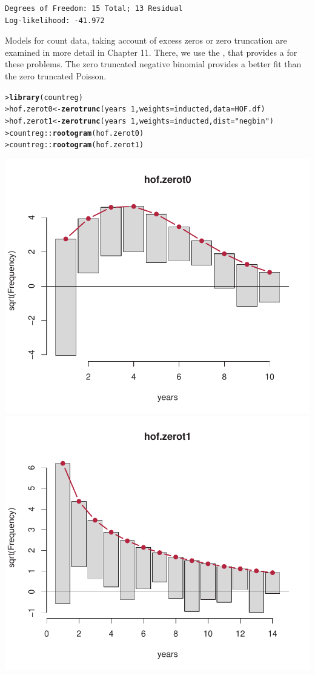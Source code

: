 \documentclass[10pt]{report}\usepackage[]{graphicx}\usepackage[]{color}
\makeatletter
\newcommand{\hlnum}[1]{\textcolor[rgb]{0.686,0.059,0.569}{#1}}%
\newcommand{\hlstr}[1]{\textcolor[rgb]{0.192,0.494,0.8}{#1}}%
\newcommand{\hlopt}[1]{\textcolor[rgb]{0,0,0}{#1}}%
\newcommand{\hlstd}[1]{\textcolor[rgb]{0.345,0.345,0.345}{#1}}%
\newcommand{\hlkwb}[1]{\textcolor[rgb]{0.69,0.353,0.396}{#1}}%
\newcommand{\hlkwc}[1]{\textcolor[rgb]{0.333,0.667,0.333}{#1}}%
\newcommand{\hlkwd}[1]{\textcolor[rgb]{0.737,0.353,0.396}{\textbf{#1}}}%
\newenvironment{kframe}{%
 \def\at@end@of@kframe{}%
 \ifinner\ifhmode%
  \def\at@end@of@kframe{\end{minipage}}%
  \begin{minipage}{\columnwidth}%
 \fi\fi%
 \def\FrameCommand##1{\hskip\@totalleftmargin \hskip-\fboxsep
 \colorbox{shadecolor}{##1}\hskip-\fboxsep
     \hskip-\linewidth \hskip-\@totalleftmargin \hskip\columnwidth}%
 \MakeFramed {\advance\hsize-\width
   \@totalleftmargin\z@ \linewidth\hsize
   \@setminipage}}%
 {\par\unskip\endMakeFramed%
 \at@end@of@kframe}
\newenvironment{knitrout}{}{} %
\renewenvironment{knitrout}{\small\renewcommand{\baselinestretch}{.85}}{} %
\makeatother
\begin{document}
\begin{Exercises}
\begin{enumerate*}
\begin{ans}
\begin{knitrout}
\begin{kframe}
\begin{verbatim}
Degrees of Freedom: 15 Total; 13 Residual
Log-likelihood: -41.972 
\end{verbatim}
\end{kframe}
\end{knitrout}
      Models for count data, taking account of excess zeros or zero truncation are examined in more detail
      in Chapter 11.  There, we use the , that provides a  for these
      problems.  The zero truncated negative binomial provides a better fit than the zero truncated Poisson.
\begin{knitrout}\footnotesize
{}\color{fgcolor}\begin{kframe}
\begin{alltt}
\hlstd{> }\hlkwd{library}\hlstd{(countreg)}
\hlstd{> }\hlstd{hof.zerot0} \hlkwb{<-} \hlkwd{zerotrunc}\hlstd{(years} \hlopt{~} \hlnum{1}\hlstd{,} \hlkwc{weights} \hlstd{= inducted,} \hlkwc{data}\hlstd{=HOF.df)}
\hlstd{> }\hlstd{hof.zerot1} \hlkwb{<-} \hlkwd{zerotrunc}\hlstd{(years} \hlopt{~} \hlnum{1}\hlstd{,} \hlkwc{weights} \hlstd{= inducted,} \hlkwc{dist}\hlstd{=}\hlstr{"negbin"}\hlstd{)}
\hlstd{> }\hlstd{countreg}\hlopt{::}\hlkwd{rootogram}\hlstd{(hof.zerot0)}
\hlstd{> }\hlstd{countreg}\hlopt{::}\hlkwd{rootogram}\hlstd{(hof.zerot1)}
\end{alltt}
\end{kframe}

\centerline{\includegraphics[width=.5\textwidth]{soln/fig/ex3_12d-1} 
\includegraphics[width=.5\textwidth]{soln/fig/ex3_12d-2} }



\end{knitrout}

      \end{ans}
      

    \end{enumerate*}


\end{Exercises}
\end{document}

